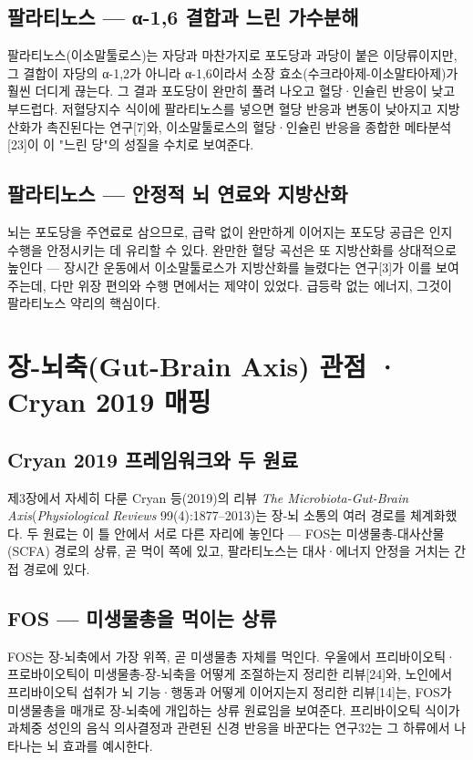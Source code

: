 \documentclass[12pt,oneside]{book}
\begin{document}
\subsection{팔라티노스 — α-1,6 결합과 느린 가수분해}

팔라티노스(이소말툴로스)는 자당과 마찬가지로 포도당과 과당이 붙은 이당류이지만, 그 결합이 자당의 α-1,2가 아니라 α-1,6이라서 소장 효소(수크라아제-이소말타아제)가 훨씬 더디게 끊는다. 그 결과 포도당이 완만히 풀려 나오고 혈당·인슐린 반응이 낮고 부드럽다. 저혈당지수 식이에 팔라티노스를 넣으면 혈당 반응과 변동이 낮아지고 지방산화가 촉진된다는 연구[7]와, 이소말툴로스의 혈당·인슐린 반응을 종합한 메타분석[23]이 이 "느린 당"의 성질을 수치로 보여준다.

\subsection{팔라티노스 — 안정적 뇌 연료와 지방산화}

뇌는 포도당을 주연료로 삼으므로, 급락 없이 완만하게 이어지는 포도당 공급은 인지 수행을 안정시키는 데 유리할 수 있다. 완만한 혈당 곡선은 또 지방산화를 상대적으로 높인다 — 장시간 운동에서 이소말툴로스가 지방산화를 늘렸다는 연구[3]가 이를 보여주는데, 다만 위장 편의와 수행 면에서는 제약이 있었다. 급등락 없는 에너지, 그것이 팔라티노스 약리의 핵심이다.

\section{장-뇌축(Gut-Brain Axis) 관점 · Cryan 2019 매핑}

\subsection{Cryan 2019 프레임워크와 두 원료}

제3장에서 자세히 다룬 Cryan 등(2019)의 리뷰 \textit{The Microbiota-Gut-Brain Axis}(\textit{Physiological Reviews} 99(4):1877–2013)는 장-뇌 소통의 여러 경로를 체계화했다. 두 원료는 이 틀 안에서 서로 다른 자리에 놓인다 — FOS는 미생물총-대사산물(SCFA) 경로의 상류, 곧 먹이 쪽에 있고, 팔라티노스는 대사·에너지 안정을 거치는 간접 경로에 있다.

\subsection{FOS — 미생물총을 먹이는 상류}

FOS는 장-뇌축에서 가장 위쪽, 곧 미생물총 자체를 먹인다. 우울에서 프리바이오틱·프로바이오틱이 미생물총-장-뇌축을 어떻게 조절하는지 정리한 리뷰[24]와, 노인에서 프리바이오틱 섭취가 뇌 기능·행동과 어떻게 이어지는지 정리한 리뷰[14]는, FOS가 미생물총을 매개로 장-뇌축에 개입하는 상류 원료임을 보여준다. 프리바이오틱 식이가 과체중 성인의 음식 의사결정과 관련된 신경 반응을 바꾼다는 연구32는 그 하류에서 나타나는 뇌 효과를 예시한다.
\end{document}
